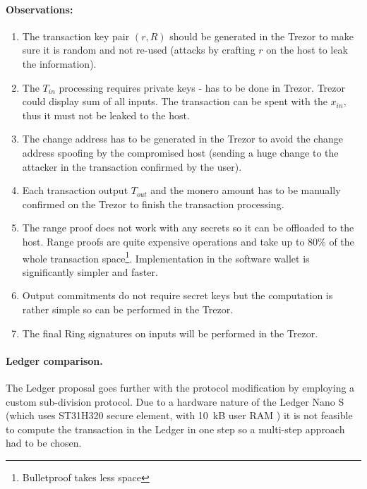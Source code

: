 \documentclass[]{article}
\begin{document}
\paragraph{Observations:}
\begin{enumerate}
    \item The transaction key pair $(r,R)$ should be generated in the Trezor to make sure it is random and not re-used (attacks by crafting $r$ on the host to leak the information). 
	
	\item The $T_{in}$ processing requires private keys - has to be done in Trezor. Trezor could display sum of all inputs. The transaction can be spent with the $x_{in}$, thus it must not be leaked to the host.
	
	\item The change address has to be generated in the Trezor to avoid the change address spoofing by the compromised host (sending a huge change to the attacker in the transaction confirmed by the user).
	
	\item Each transaction output $T_{out}$ and the monero amount has to be manually confirmed on the Trezor to finish the transaction processing.
	
	\item The range proof does not work with any secrets so it can be offloaded to the host. Range proofs are quite expensive operations and take up to 80\% of the whole transaction space\footnote{Bulletproof takes less space}. Implementation in the software wallet is significantly simpler and faster.
	
	\item Output commitments do not require secret keys but the computation is rather simple so can be performed in the Trezor.
	
	\item The final Ring signatures on inputs will be performed in the Trezor.
\end{enumerate}

\paragraph{Ledger comparison.} The Ledger proposal \cite{ledger_doc} goes further with the protocol modification by employing a custom sub-division protocol. Due to a hardware nature of the Ledger Nano S (which uses ST31H320 secure element, with 10~kB user RAM \cite{hw_wallet_vulns, st31h320}) it is not feasible to compute the transaction in the Ledger in one step so a multi-step approach had to be chosen.
\end{document}
